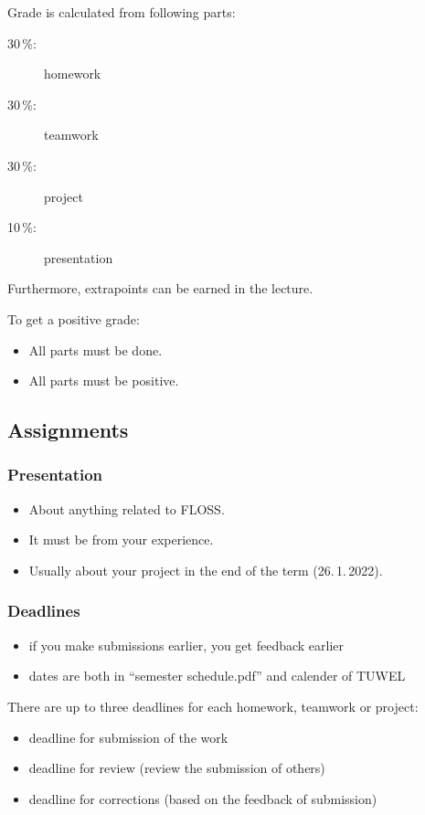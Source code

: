 \begin{frame}
	Grade is calculated from following parts:
	\begin{description}
	\item[30\,\%:] homework
	\item[30\,\%:] teamwork
	\item[30\,\%:] project
	\item[10\,\%:] presentation
	\end{description}

	Furthermore, extrapoints can be earned in the lecture.

	\vspace{1cm}

	To get a positive grade:
	\begin{itemize}
		\item All parts must be done.
		\item All parts must be positive.
	\end{itemize}
\end{frame}

\subsection{Assignments}
\begin{frame}
	\frametitle{Presentation}
	\begin{itemize}
		\item About anything related to FLOSS.
		\item It must be from your experience.
		\item Usually about your project in the end of the term (26.\,1.\,2022).
	\end{itemize}
\end{frame}

\begin{frame}
	\frametitle{Deadlines}

	\begin{itemize}
	\item if you make submissions earlier, you get feedback earlier
	\item dates are both in ``semester schedule.pdf'' and calender of TUWEL
	\end{itemize}

	\vspace{1em}

	There are up to three deadlines for each homework, teamwork or project:

	\begin{itemize}
	\item deadline for submission of the work
	\item deadline for review (review the submission of others)
	\item deadline for corrections (based on the feedback of submission)
	\end{itemize}
\end{frame}

